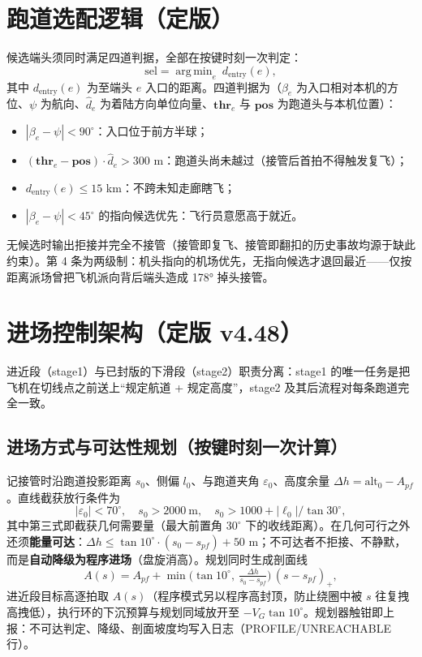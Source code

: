 \documentclass[12pt,UTF8,a4paper]{ctexart}
\DeclareMathOperator*{\argmin}{arg\,min}
\begin{document}
\section{跑道选配逻辑（定版）}
候选端头须同时满足四道判据，全部在按键时刻一次判定：
\begin{equation}
\mathrm{sel}=\argmin_{e}\ d_{\mathrm{entry}}(e),
\end{equation}
其中 $d_{\mathrm{entry}}(e)$ 为至端头 $e$ 入口的距离。四道判据为（$\beta_e$ 为入口相对本机的方位、$\psi$ 为航向、$\hat{d}_e$ 为着陆方向单位向量、$\mathbf{thr}_e$ 与 $\mathbf{pos}$ 为跑道头与本机位置）：
\begin{itemize}
\item $|\beta_e-\psi|<90^\circ$：入口位于前方半球；
\item $(\mathbf{thr}_e-\mathbf{pos})\cdot\hat{d}_e>300$ m：跑道头尚未越过（接管后首拍不得触发复飞）；
\item $d_{\mathrm{entry}}(e)\le 15$ km：不跨未知走廊瞎飞；
\item $|\beta_e-\psi|<45^\circ$ 的指向候选优先：飞行员意愿高于就近。
\end{itemize}
无候选时输出拒接并完全不接管（接管即复飞、接管即翻扣的历史事故均源于缺此约束）。第 4 条为两级制：机头指向的机场优先，无指向候选才退回最近——仅按距离派场曾把飞机派向背后端头造成 178° 掉头接管。

\section{进场控制架构（定版 v4.48）}
进近段（stage1）与已封版的下滑段（stage2）职责分离：stage1 的唯一任务是把飞机在切线点之前送上``规定航道 + 规定高度''，stage2 及其后流程对每条跑道完全一致。

\subsection{进场方式与可达性规划（按键时刻一次计算）}
记接管时沿跑道投影距离 $s_0$、侧偏 $l_0$、与跑道夹角 $\varepsilon_0$、高度余量 $\Delta h = \text{alt}_0 - A_{pf}$。直线截获放行条件为
\[
|\varepsilon_0| < 70^\circ,\quad s_0 > 2000\ \text{m},\quad s_0 > 1000 + |\ell_0|/\tan 30^\circ,
\]
其中第三式即截获几何需要量（最大前置角 $30^\circ$ 下的收线距离）。在几何可行之外还须\textbf{能量可达}：$\Delta h \le \tan 10^\circ\cdot(s_0 - s_{pf}) + 50$ m；不可达者不拒接、不静默，而是\textbf{自动降级为程序进场}（盘旋消高）。规划同时生成剖面线
\[
A(s) = A_{pf} + \min\!\big(\tan 10^\circ,\ \tfrac{\Delta h}{s_0 - s_{pf}}\big)\,(s - s_{pf})_+,
\]
进近段目标高逐拍取 $A(s)$（程序模式另以程序高封顶，防止绕圈中被 $s$ 往复拽高拽低），执行环的下沉预算与规划同域放开至 $-V_G\tan 10^\circ$。规划器触钳即上报：不可达判定、降级、剖面坡度均写入日志（PROFILE/UNREACHABLE 行）。
\end{document}
